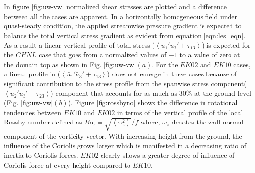 \documentclass{amsart}
\begin{document}
In figure \ref{fig:uw-vw} normalized shear stresses are plotted and a difference between all the cases are apparent. In a horizontally homogeneous field under quasi-steady condition, the applied streamwise pressure gradient is expected to balance the total vertical stress gradient as evident from equation \ref{eqn:les_eqn}. As a result a linear vertical profile of total stress ($\left <\bar{u_1}'\bar{u_3}'+\tau_{13} \right>$)  is expected for the $CHNL$ case that goes from a normalized values of $-1$ to a value of zero at the domain top as shown in Fig. \ref{fig:uw-vw}$(a)$. For the $EK02$ and $EK10$ cases, a linear profile in ($\left <\bar{u}_{1}'\bar{u}_{3}'+\tau_{13} \right>$) does not emerge in these cases because of significant contribution to the stress profile from  the spanwise stress component($\left <\bar{u}_{2}'\bar{u}_{3}'+\tau_{23} \right>$) component that accounts for as much as $30\%$ at the ground level (Fig. \ref{fig:uw-vw}$(b)$). Figure \ref{fig:rossbyno} shows the difference in rotational tendencies between $EK10$ and $EK02$ in terms of the vertical profile of the local Rossby number defined as $Ro_{z} = \sqrt{\left <  \omega_{z}^2\right >}/f$ where, $\omega_z$ denotes the wall-normal component of the vorticity vector. With increasing height from the ground, the influence of the Coriolis grows larger which is manifested in a decreasing ratio of inertia to Coriolis forces. $EK02$ clearly shows a greater degree of influence of Coriolis force at every height compared to $EK10$. 
\graphicspath{{chap1Img/}}
\end{document}
